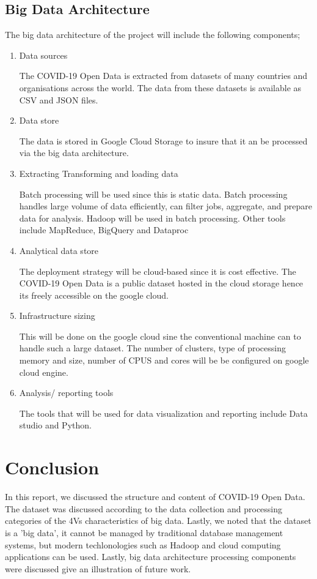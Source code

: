 \documentclass[12pt,letterpaper, twoside]{article}
\begin{document}
\subsection{Big Data Architecture}
The big data architecture of the project  will include the following components;
\begin{enumerate}
    \item Data sources
    
    The COVID-19 Open Data is extracted from datasets of  many countries and organisations across the world. The data from these datasets is available as CSV and JSON files.
    \item Data store
    
    The data is stored in Google Cloud Storage to insure that it an be processed via the big data architecture.
    \item Extracting Transforming and loading data
    
    Batch processing will be used since this is static data. Batch processing handles large volume of data efficiently, can filter jobs, aggregate, and prepare data for analysis. Hadoop will be used in batch processing.  Other tools include MapReduce, BigQuery and Dataproc
    
    \item Analytical data store
    
    The deployment strategy will be cloud-based since it is cost effective. The COVID-19 Open Data is a public dataset hosted in the cloud storage hence its freely accessible on the google cloud.
    
    \item Infrastructure sizing
    
    This will be done on the google cloud sine the conventional machine can to handle such a large dataset. The number of clusters, type of processing memory and size, number of CPUS and cores will be be configured on google cloud engine. 
    
    \item Analysis/ reporting tools
    
    The tools that will be used for data visualization and reporting include Data studio and  Python.
    
\end{enumerate}

\section{Conclusion}
In this report, we discussed the structure and content of COVID-19  Open Data. The  dataset  was discussed according to the data  collection and processing categories of the 4Vs characteristics of big data. Lastly, we noted that the dataset is a 'big data', it cannot  be managed by traditional database management systems, but modern techlonologies such as Hadoop and cloud computing applications can be used. Lastly, big data architecture processing components were discussed give an illustration of future work. 
\end{document}

